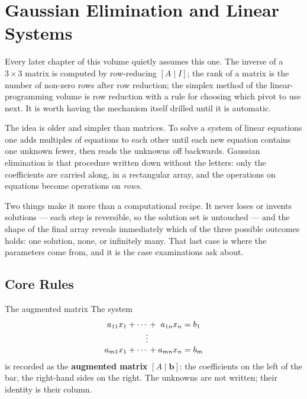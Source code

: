 \chapter{Gaussian Elimination and Linear Systems}

Every later chapter of this volume quietly assumes this one. The inverse of
a $3\times3$ matrix is computed by row-reducing $[A\mid I]$; the rank of a
matrix is the number of non-zero rows after row reduction; the simplex
method of the linear-programming volume is row reduction with a rule for
choosing which pivot to use next. It is worth having the mechanism itself
drilled until it is automatic.

The idea is older and simpler than matrices. To solve a system of linear
equations one adds multiples of equations to each other until each new
equation contains one unknown fewer, then reads the unknowns off backwards.
Gaussian elimination is that procedure written down without the letters:
only the coefficients are carried along, in a rectangular array, and the
operations on equations become operations on \emph{rows}.

Two things make it more than a computational recipe. It never loses or
invents solutions --- each step is reversible, so the solution set is
untouched --- and the shape of the final array reveals immediately which of
the three possible outcomes holds: one solution, none, or infinitely many.
That last case is where the parameters come from, and it is the case
examinations ask about.

\section{Core Rules}

\begin{rulebox}{The augmented matrix}
The system
\[
  \begin{array}{r@{}c@{}r@{}c@{}r@{}c@{}l}
    a_{11}x_{1}&{}+{}&\cdots&{}+{}&a_{1n}x_{n}&{}={}&b_{1}\\
    &&\vdots&&&&\\
    a_{m1}x_{1}&{}+{}&\cdots&{}+{}&a_{mn}x_{n}&{}={}&b_{m}
  \end{array}
\]
is recorded as the \textbf{augmented matrix} $[A\mid \mathbf{b}]$: the
coefficients on the left of the bar, the right-hand sides on the right. The
unknowns are not written; their identity is their column.
\end{rulebox}

